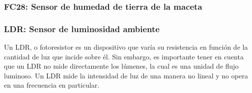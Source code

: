     
        \subsubsection{FC28: Sensor de humedad de tierra de la maceta}
    
    
        \subsubsection{LDR: Sensor de luminosidad ambiente}
        Un LDR, o fotoresistor es un dispositivo que varía su resistencia en función de la cantidad de luz que incide sobre él. Sin embargo, es importante tener en cuenta que un LDR no mide directamente los lúmenes, la cual es una unidad de flujo luminoso. Un LDR mide la intensidad de luz de una manera no lineal y no opera en una frecuencia en particular.
        
